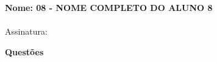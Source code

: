 \documentclass[addpoints,,12pt]{exam}
\begin{document}
	\begin{mdframed}[align=left]
		\textbf{Nome: 08 - NOME COMPLETO DO ALUNO 8}
		\\
		\\Assinatura:
	\end{mdframed}

	\newpage	
	
\noindent \textbf{Questões}

\begin{questions}










\end{questions}
\end{document}

